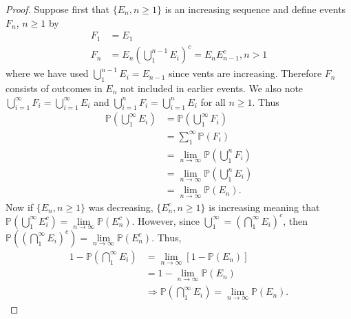 \documentclass[a4paper,11pt]{article}
\begin{document}
\begin{outline}
    \begin{proof}
      Suppose first that \(\{E_n, n \geq 1\}\) is an increasing sequence and define events \(F_n\), \(n \geq 1\) by
      \begin{align*}
        F_1 &= E_1\\
        F_n &= E_n(\bigcup_{1}^{n-1}E_i)^c = E_nE_{n-1}^c, n > 1
      \end{align*}
      where we have used \(\bigcup_{1}^{n-1}E_i = E_{n-1}\) since vents are increasing. Therefore \(F_n\) consists
      of outcomes in \(E_n\) not included in earlier events. We also note \(\bigcup_{i=1}^{\infty} F_i = 
      \bigcup_{i=1}^{\infty} E_i\) and \(\bigcup_{i=1}^{n} F_i = \bigcup_{i=1}^{n} E_i\) for all \(n \geq 1\). Thus 
      \begin{align*}
        \mathbb{P}(\bigcup_{1}^{\infty} E_i) &= \mathbb{P}(\bigcup_{1}^{\infty} F_i)\\
                                             &= \sum_{1}^{\infty} \mathbb{P}(F_i)\\
                                             &= \lim_{n\rightarrow\infty} \mathbb{P}(\bigcup_{1}^n F_i)\\
                                             &= \lim_{n\rightarrow\infty} \mathbb{P}(\bigcup_{1}^n E_i)\\
                                             &= \lim_{n\rightarrow\infty} \mathbb{P}(E_n)\text{.}
      \end{align*}
      Now if \(\{E_n, n \geq 1\}\) was decreasing, \(\{E_n^c, n \geq 1\}\) is increasing meaning that
      \(\mathbb{P}(\bigcup_{1}^{\infty} E_i^c) = \lim\limits_{n\rightarrow\infty} \mathbb{P}(E_n^c)\).
      However, since \(\bigcup_{1}^{\infty} = (\bigcap_{1}^{\infty}E_i)^c\), then 
      \(\mathbb{P}((\bigcap_{1}^{\infty}E_i)^c) = \lim\limits_{n\rightarrow\infty} \mathbb{P}(E_n^c)\). Thus,
      \begin{align*}
        1 - \mathbb{P}(\bigcap_{1}^{\infty} E_i) &= \lim_{n\rightarrow\infty} [1-\mathbb{P}(E_n)] \\
                                                 &= 1 - \lim_{n\rightarrow\infty} \mathbb{P}(E_n) \\
                                                 &\Rightarrow \mathbb{P}(\bigcap_{1}^{\infty} E_i) = 
                                                  \lim_{n\rightarrow\infty}\mathbb{P}(E_n)\text{.}
      \end{align*}
    \end{proof}
    
    

\end{outline}
\end{document}
